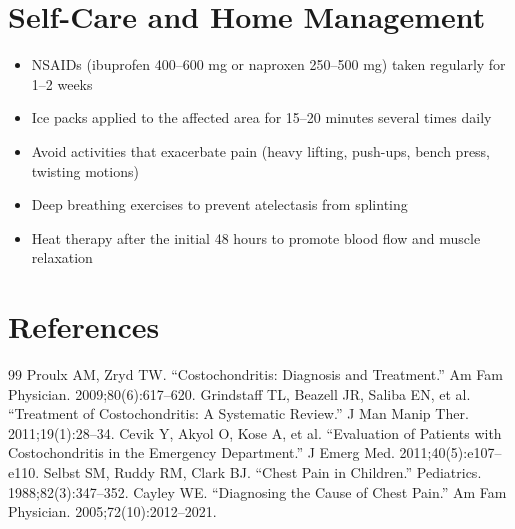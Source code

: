 \section*{Self-Care and Home Management}
\begin{itemize}
  \item NSAIDs (ibuprofen 400--600 mg or naproxen 250--500 mg) taken regularly for 1--2 weeks
  \item Ice packs applied to the affected area for 15--20 minutes several times daily
  \item Avoid activities that exacerbate pain (heavy lifting, push-ups, bench press, twisting motions)
  \item Deep breathing exercises to prevent atelectasis from splinting
  \item Heat therapy after the initial 48 hours to promote blood flow and muscle relaxation
\end{itemize}

\section*{References}
\begin{thebibliography}{99}
 Proulx AM, Zryd TW. ``Costochondritis: Diagnosis and Treatment.'' Am Fam Physician. 2009;80(6):617--620.
 Grindstaff TL, Beazell JR, Saliba EN, et al. ``Treatment of Costochondritis: A Systematic Review.'' J Man Manip Ther. 2011;19(1):28--34.
 Cevik Y, Akyol O, Kose A, et al. ``Evaluation of Patients with Costochondritis in the Emergency Department.'' J Emerg Med. 2011;40(5):e107--e110.
 Selbst SM, Ruddy RM, Clark BJ. ``Chest Pain in Children.'' Pediatrics. 1988;82(3):347--352.
 Cayley WE. ``Diagnosing the Cause of Chest Pain.'' Am Fam Physician. 2005;72(10):2012--2021.
\end{thebibliography}
